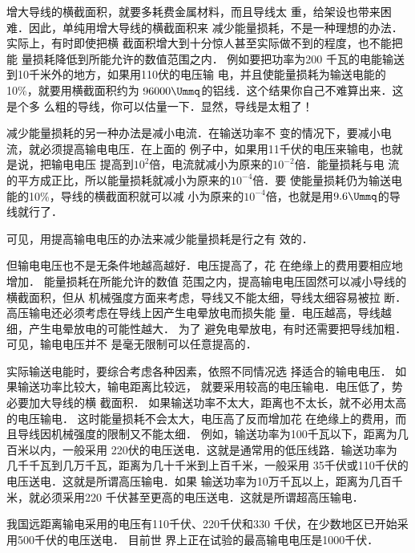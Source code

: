 增大导线的横截面积，就要多耗费金属材料，而且导线太
重，给架设也带来困难．因此，单纯用增大导线的横截面积来
减少能量损耗，不是一种理想的办法．实际上，有时即使把横
截面积增大到十分惊人甚至实际做不到的程度，也不能把能
量损耗降低到所能允许的数值范围之内．
例如要把功率为200
千瓦的电能输送到10千米外的地方，如果用110伏的电压输
电，并且使能量损耗为输送电能的10\%，就要用横截面积约为
$96000 \Ummq $的铝线．这个结果你自己不难算出来．这是个多
么粗的导线，你可以估量一下．显然，导线是太粗了！

减少能量损耗的另一种办法是减小电流．在输送功率不
变的情况下，要减小电流，就必须提高输电电压．在上面的
例子中，如果用11千伏的电压来输电，也就是说，把输电电压
提高到$10^2$倍，电流就减小为原来的$10^{-2}$倍．能量损耗与电
流的平方成正比，所以能量损耗就减小为原来的$10^{-4}$倍．要
使能量损耗仍为输送电能的10\%，导线的横截面积就可以减
小为原来的$10^{-4}$倍，也就是用$9.6 \Ummq $的导线就行了．

可见，用提高输电电压的办法来减少能量损耗是行之有
效的．

但输电电压也不是无条件地越高越好．电压提高了，花
在绝缘上的费用要相应地增加．
能量损耗在所能允许的数值
范围之内，提高输电电压固然可以减小导线的横截面积，但从
机械强度方面来考虑，导线又不能太细，导线太细容易被拉
断．
高压输电还必须考虑在导线上因产生电晕放电而损失能
量．电压越高，导线越细，产生电晕放电的可能性越大．
为了
避免电晕放电，有时还需要把导线加粗．可见，输电电压并不
是毫无限制可以任意提高的．

实际输送电能时，要综合考虑各种因素，依照不同情况选
择适合的输电电压．
如果输送功率比较大，输电距离比较远，
就要采用较高的电压输电．电压低了，势必要加大导线的横
截面积．
如果输送功率不太大，距离也不太长，就不必用太高
的电压输电．
这时能量损耗不会太大，电压高了反而增加花
在绝缘上的费用，而且导线因机械强度的限制又不能太细．
例如，输送功率为100千瓦以下，距离为几百米以内，一般采用
220伏的电压送电．这就是通常用的低压线路．输送功率为
几千千瓦到几万千瓦，距离为几十千米到上百千米，一般采用
35千伏或110千伏的电压送电．这就是所谓高压输电．如果
输送功率为10万千瓦以上，距离为几百千米，就必须采用220
千伏甚至更高的电压送电．这就是所谓超高压输电．

我国远距离输电采用的电压有110千伏、220千伏和330
千伏，在少数地区已开始采用500千伏的电压送电．
目前世
界上正在试验的最高输电电压是1000千伏．


